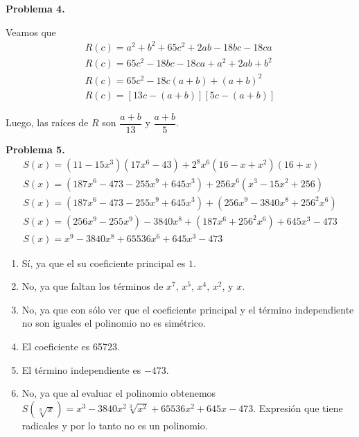 \textbf{Problema 4.}

Veamos que
\begin{gather*}
    R(c) = a^2 + b^2 + 65c^2 + 2ab - 18bc - 18ca\\
    R(c) = 65c^2 - 18bc - 18ca + a^2 + 2ab + b^2\\
    R(c) = 65c^2 - 18c(a + b) + (a + b)^2\\
    R(c) = [13c - (a + b)][5c - (a + b)]
\end{gather*}

Luego, las raíces de $R$ son $\boxed{\dfrac{a + b}{13}}$ y $\boxed{\dfrac{a + b}{5}}$.

\textbf{Problema 5.}
\begin{gather*}
    S(x) = (11 - 15x^3)(17x^6 - 43) + 2^8 x^6 (16 - x + x^2)(16 + x)\\
    S(x) = (187 x^6 - 473 - 255x^9 + 645x^3) + 256 x^6 (x^3 - 15x^2 + 256)\\
    S(x) = (187 x^6 - 473 - 255x^9 + 645x^3) + (256 x^9 - 3840 x^8 + 256^2 x^6)\\
    S(x) = (256 x^9 - 255x^9) - 3840 x^8 + (187 x^6 + 256^2 x^6) + 645x^3 - 473\\
    S(x) = x^9 - 3840 x^8 + 65536 x^6 + 645x^3 - 473
\end{gather*}

\begin{enumerate}
    \item Sí, ya que el su coeficiente principal es $1$.
    \item No, ya que faltan los términos de $x^7$, $x^5$, $x^4$, $x^2$, y $x$.
    \item No, ya que con sólo ver que el coeficiente principal y el término independiente no son iguales el polinomio no es simétrico.
    \item El coeficiente es 65723.
    \item El término independiente es $-473$.
    \item No, ya que al evaluar el polinomio obtenemos $S(\sqrt[3]{x}) = x^3 - 3840 x^2\sqrt[3]{x^2} + 65536 x^2 + 645x - 473$. Expresión que tiene radicales y por lo tanto no es un polinomio.
\end{enumerate}
